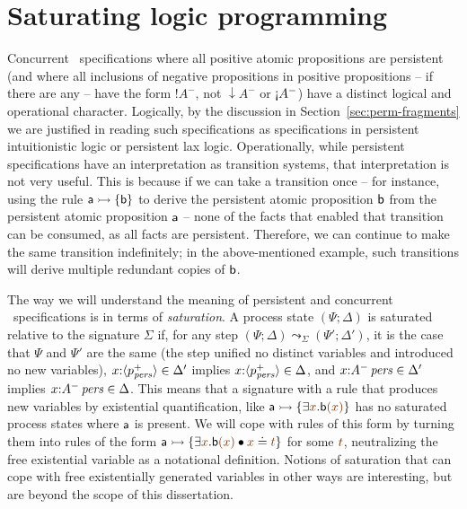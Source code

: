 \section{Saturating logic programming}

Concurrent \sls~specifications where all positive atomic propositions
are persistent (and where all inclusions of negative propositions in
positive propositions -- if there are any -- have the form ${!}A^-$, not
${\downarrow}A^-$ or ${\gnab}A^-$) have a distinct logical and
operational character. Logically, by the discussion in
Section~\ref{sec:perm-fragments} we are justified in reading such
specifications as specifications in persistent intuitionistic logic or
persistent lax logic. Operationally, while persistent specifications
have an interpretation as transition systems, that interpretation is
not very useful. This is because if we can take a transition once --
for instance, using the rule ${\sf a} \rightarrowtail \{ {\sf b} \}$ to derive
the persistent atomic proposition ${\sf b}$ from the persistent atomic
proposition ${\sf a}$ -- none of the facts that enabled that
transition can be consumed, as all facts are persistent. Therefore, we
can continue to make the same transition indefinitely; in the
above-mentioned example, such transitions will derive multiple
redundant copies of ${\sf b}$.

The way we will understand the meaning of persistent and concurrent
\sls~specifications is in terms of {\it saturation}. A process state
$(\Psi; \Delta)$ is saturated relative to the signature $\Sigma$ if,
for any step $(\Psi; \Delta) \leadsto_\Sigma (\Psi'; \Delta')$, it is
the case that $\Psi$ and $\Psi'$ are the same (the step unified no
distinct variables and introduced no new variables),
$x{:}\langle {p^+_{\it pers}} \rangle \in \Delta'$ implies $x{:}\langle {p^+_{\it pers}} \rangle \in
\Delta$, and $x{:}{A^-}\,{{\it pers}} \in \Delta'$ implies $x{:}{A^-}\,{{\it pers}}
\in \Delta$. This means that a signature with a rule that produces new
variables by existential quantification, like ${\sf a} \lefti \{
\exists \lf{x}. {\sf b}\lf{(x)} \}$ has no saturated process states
where ${\sf a}$ is present. We will cope with rules of this form by
turning them into rules of the form ${\sf a} \lefti \{ \exists
\lf{x}. {\sf b}\lf{(x)} \fuse \lf{x} \doteq \lf{t} \}$ for some
$\lf{t}$, neutralizing the free existential variable as a notational
definition. Notions of saturation that can cope with free
existentially generated variables in other ways
are interesting, but are beyond the
scope of this dissertation.

